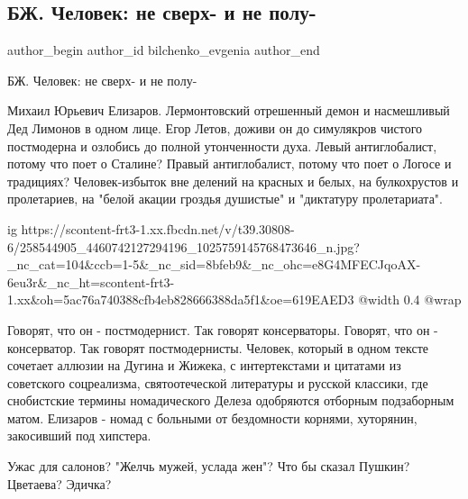  
 
 
 
 
 
\subsection{БЖ. Человек: не сверх- и не полу-}
\label{sec:21_11_2021.fb.bilchenko_evgenia.2.chelovek_ne_sverh_ne_polu}
 
\ifcmt
 author_begin
   author_id bilchenko_evgenia
 author_end
\fi

БЖ. Человек: не сверх- и не полу-

Михаил Юрьевич Елизаров. Лермонтовский отрешенный демон и насмешливый Дед
Лимонов в одном лице. Егор Летов, доживи он до симулякров чистого постмодерна и
озлобись до полной утонченности духа. Левый антиглобалист, потому что поет о
Сталине? Правый антиглобалист, потому что поет о Логосе и традициях?
Человек-избыток вне делений на красных и белых, на булкохрустов и пролетариев,
на "белой акации гроздья душистые" и "диктатуру пролетариата".

\ifcmt
  ig https://scontent-frt3-1.xx.fbcdn.net/v/t39.30808-6/258544905_4460742127294196_1025759145768473646_n.jpg?_nc_cat=104&ccb=1-5&_nc_sid=8bfeb9&_nc_ohc=e8G4MFECJqoAX-6eu3r&_nc_ht=scontent-frt3-1.xx&oh=5ac76a740388cfb4eb828666388da5f1&oe=619EAED3
  @width 0.4
  @wrap 
\fi

Говорят, что он - постмодернист. Так говорят консерваторы. Говорят, что он -
консерватор. Так говорят постмодернисты. Человек, который в одном тексте
сочетает аллюзии на Дугина и Жижека, с интертекстами и цитатами из советского
соцреализма, святоотеческой литературы и русской классики, где снобистские
термины номадического Делеза одобряются отборным подзаборным матом. Елизаров -
номад с больными от бездомности корнями, хуторянин, закосивший под хипстера.

Ужас для салонов? "Желчь мужей, услада жен"? Что бы сказал Пушкин? Цветаева?
Эдичка?

